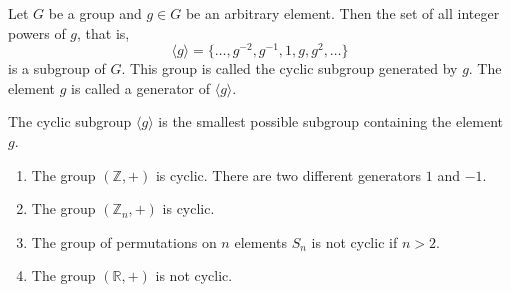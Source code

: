 \begin{definition}
Let $G$ be a group and $g\in G$ be an arbitrary element.
Then the set of all integer powers of $g$, that is,
\[
\langle g \rangle = \{ \ldots, g^{-2},g^{-1},1, g, g^2, \ldots\}
\]
is a subgroup of $G$.
This group is called the cyclic subgroup generated by $g$.
The element $g$ is called a generator of $\langle g\rangle$.
\end{definition}

The cyclic subgroup $\langle g\rangle$ is the smallest possible subgroup containing the element $g$.

\begin{examples}
\begin{enumerate}
\item The group $(\mathbb Z, +)$ is cyclic.
There are two different generators $1$ and $-1$.

\item The group $(\mathbb Z_n, +)$ is cyclic.

\item The group of permutations on $n$ elements $S_n$ is not cyclic if $n >2$.

\item The group $(\mathbb R, +)$ is not cyclic.
\end{enumerate}
\end{examples}


